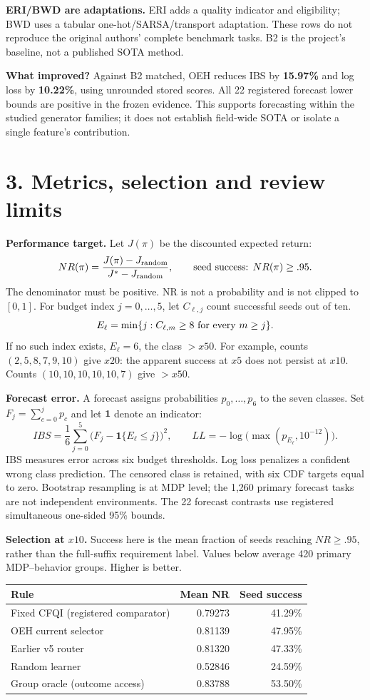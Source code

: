 \documentclass[10pt,a4paper]{article}
\begin{document}
\textbf{ERI/BWD are adaptations.} ERI adds a quality indicator and eligibility; BWD uses a tabular one-hot/SARSA/transport adaptation. These rows do not reproduce the original authors' complete benchmark tasks. B2 is the project's baseline, not a published SOTA method.

\textbf{What improved?} Against B2 matched, OEH reduces IBS by \textbf{15.97\%} and log loss by \textbf{10.22\%}, using unrounded stored scores. All 22 registered forecast lower bounds are positive in the frozen evidence. This supports forecasting within the studied generator families; it does not establish field-wide SOTA or isolate a single feature's contribution.

\newpage
\section*{3. Metrics, selection and review limits}
\textbf{Performance target.} Let $J(\pi)$ be the discounted expected return:
\[
 NR(\pi)=\frac{J(\pi)-J_{\rm random}}{J^*-J_{\rm random}},
 \qquad \hbox{seed success: }NR(\pi)\ge .95.
\]
The denominator must be positive. NR is not a probability and is not clipped to $[0,1]$.
For budget index $j=0,\ldots,5$, let $C_{\ell,j}$ count successful seeds out of ten.
\[
 E_{\ell}=\min\{j:C_{\ell,m}\ge8\ \hbox{for every }m\ge j\}.
\]
If no such index exists, $E_{\ell}=6$, the class $>x50$. For example, counts $(2,5,8,7,9,10)$ give $x20$: the apparent success at $x5$ does not persist at $x10$. Counts $(10,10,10,10,10,7)$ give $>x50$.

\textbf{Forecast error.} A forecast assigns probabilities $p_0,\ldots,p_6$ to the seven classes. Set $F_j=\sum_{c=0}^{j}p_c$ and let $\mathbf{1}$ denote an indicator:
\[
 IBS=\frac{1}{6}\sum_{j=0}^{5}\bigl(F_j-\mathbf{1}\{E_{\ell}\le j\}\bigr)^2,
 \qquad LL=-\log\bigl(\max(p_{E_{\ell}},10^{-12})\bigr).
\]
IBS measures error across six budget thresholds. Log loss penalizes a confident wrong class prediction. The censored class is retained, with six CDF targets equal to zero. Bootstrap resampling is at MDP level; the 1,260 primary forecast tasks are not independent environments. The 22 forecast contrasts use registered simultaneous one-sided 95\% bounds.

\textbf{Selection at $x10$.} Success here is the mean fraction of seeds reaching $NR\ge.95$, rather than the full-suffix requirement label. Values below average 420 primary MDP--behavior groups. Higher is better.

{\small\centering
\begin{tabular}{@{}lrr@{}}\hline
\textbf{Rule} & \textbf{Mean NR} & \textbf{Seed success}\\\hline
Fixed CFQI (registered comparator) & 0.79273 & 41.29\%\\
OEH current selector & 0.81139 & 47.95\%\\
Earlier v5 router & 0.81320 & 47.33\%\\
Random learner & 0.52846 & 24.59\%\\
Group oracle (outcome access) & 0.83788 & 53.50\%\\\hline
\end{tabular}\par}
\end{document}
